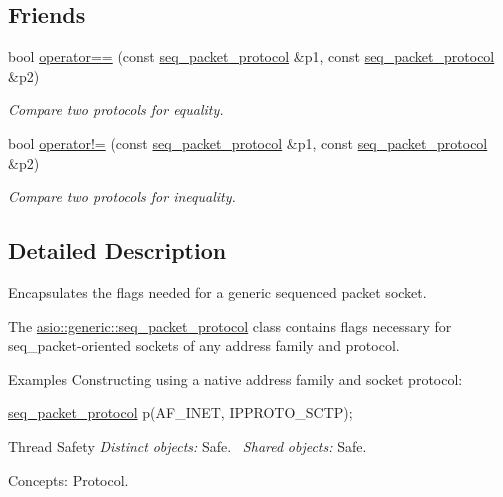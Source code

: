 \subsection*{Friends}
\begin{DoxyCompactItemize}
\item 
bool \hyperlink{classasio_1_1generic_1_1seq__packet__protocol_a221fccc4779e458a78c268771223323c}{operator==} (const \hyperlink{classasio_1_1generic_1_1seq__packet__protocol}{seq\+\_\+packet\+\_\+protocol} \&p1, const \hyperlink{classasio_1_1generic_1_1seq__packet__protocol}{seq\+\_\+packet\+\_\+protocol} \&p2)
\begin{DoxyCompactList}\small\item\em Compare two protocols for equality. \end{DoxyCompactList}\item 
bool \hyperlink{classasio_1_1generic_1_1seq__packet__protocol_ac1f5b16b4cd628c46710fb7d0d81e54c}{operator!=} (const \hyperlink{classasio_1_1generic_1_1seq__packet__protocol}{seq\+\_\+packet\+\_\+protocol} \&p1, const \hyperlink{classasio_1_1generic_1_1seq__packet__protocol}{seq\+\_\+packet\+\_\+protocol} \&p2)
\begin{DoxyCompactList}\small\item\em Compare two protocols for inequality. \end{DoxyCompactList}\end{DoxyCompactItemize}


\subsection{Detailed Description}
Encapsulates the flags needed for a generic sequenced packet socket. 

The \hyperlink{classasio_1_1generic_1_1seq__packet__protocol}{asio\+::generic\+::seq\+\_\+packet\+\_\+protocol} class contains flags necessary for seq\+\_\+packet-\/oriented sockets of any address family and protocol.

\begin{DoxyParagraph}{Examples}
Constructing using a native address family and socket protocol\+: 
\begin{DoxyCode}
\hyperlink{classasio_1_1generic_1_1seq__packet__protocol_afedfbddd438642e3cdfd7ce2cf0fa5fe}{seq\_packet\_protocol} p(AF\_INET, IPPROTO\_SCTP); 
\end{DoxyCode}

\end{DoxyParagraph}
\begin{DoxyParagraph}{Thread Safety}
{\itshape Distinct} {\itshape objects\+:} Safe.~\newline
{\itshape Shared} {\itshape objects\+:} Safe.
\end{DoxyParagraph}
\begin{DoxyParagraph}{Concepts\+:}
Protocol. 
\end{DoxyParagraph}


